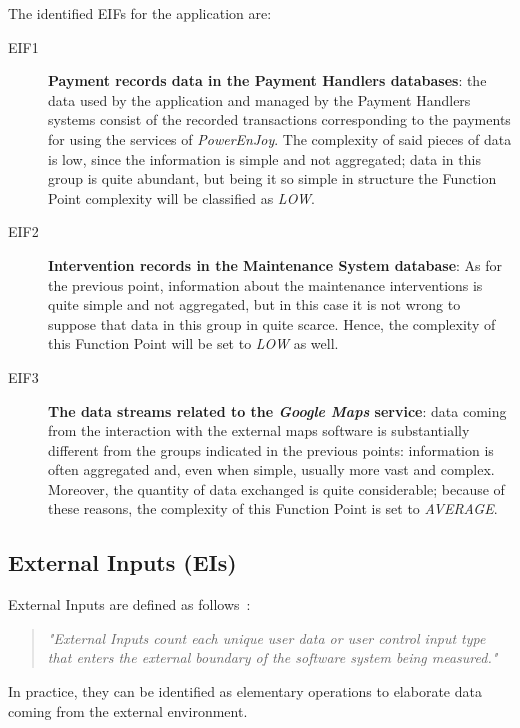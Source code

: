 The identified EIFs for the application are:
\begin{description}
\item[EIF1] \textbf{Payment records data in the Payment Handlers databases}: the data used by the application and managed by the Payment Handlers systems consist of the recorded transactions corresponding to the payments for using the services of \textit{PowerEnJoy}. The complexity of said pieces of data is low, since the information is simple and not aggregated; data in this group is quite abundant, but being it so simple in structure the Function Point complexity will be classified as \textit{LOW}.
\item[EIF2] \textbf{Intervention records in the Maintenance System database}: As for the previous point, information about the maintenance interventions is quite simple and not aggregated, but in this case it is not wrong to suppose that data in this group in quite scarce. Hence, the complexity of this Function Point will be set to \textit{LOW} as well.
\item[EIF3] \textbf{The data streams related to the \textit{Google Maps} service}: data coming from the interaction with the external maps software is substantially different from the groups indicated in the previous points: information is often aggregated and, even when simple, usually more vast and complex. Moreover, the quantity of data exchanged is quite considerable; because of these reasons, the complexity of this Function Point is set to \textit{AVERAGE}.
\end{description}

\subsection{External Inputs (EIs)}
External Inputs are defined as follows~\cite{cocomo-manual}:
\begin{quotation}
\textit{"External Inputs count each unique user data or user control input type that enters the external boundary of the software system being measured."}
\end{quotation}
In practice, they can be identified as elementary operations to elaborate data coming from the external environment.

